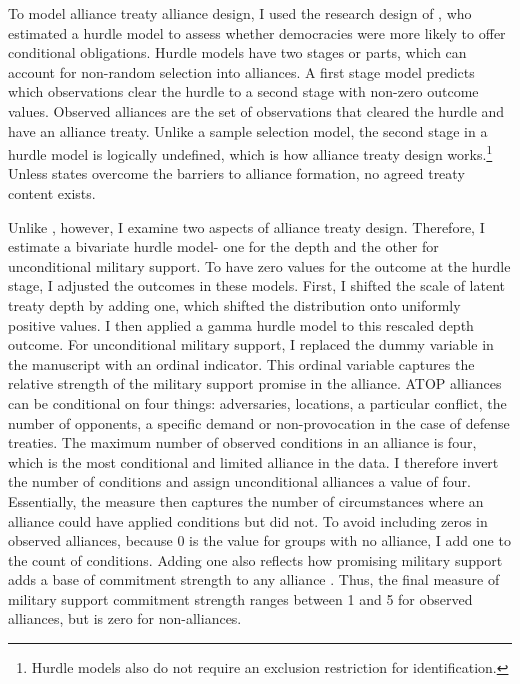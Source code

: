 \documentclass[12pt]{article}
\begin{document}
To model alliance treaty alliance design, I used the research design of \citet{Chibaetal2015}, who estimated a hurdle model to assess whether democracies were more likely to offer conditional obligations.
Hurdle models have two stages or parts, which can account for non-random selection into alliances.
A first stage model predicts which observations clear the hurdle to a second stage with non-zero outcome values. 
Observed alliances are the set of observations that cleared the hurdle and have an alliance treaty. 
Unlike a sample selection model, the second stage in a hurdle model is logically undefined, which is how alliance treaty design works.\footnote{Hurdle models also do not require an exclusion restriction for identification.} 
Unless states overcome the barriers to alliance formation, no agreed treaty content exists. 


Unlike \citet{Chibaetal2015}, however, I examine two aspects of alliance treaty design. 
Therefore, I estimate a bivariate hurdle model- one for the depth and the other for unconditional military support. 
To have zero values for the outcome at the hurdle stage, I adjusted the outcomes in these models. 
First, I shifted the scale of latent treaty depth by adding one, which shifted the distribution onto uniformly positive values. 
I then applied a gamma hurdle model to this rescaled depth outcome.  
For unconditional military support, I replaced the dummy variable in the manuscript with an ordinal indicator.
This ordinal variable captures the relative strength of the military support promise in the alliance. 
ATOP alliances can be conditional on four things: adversaries, locations, a particular conflict, the number of opponents, a specific demand or non-provocation in the case of defense treaties. 
The maximum number of observed conditions in an alliance is four, which is the most conditional and limited alliance in the data. 
I therefore invert the number of conditions and assign unconditional alliances a value of four. 
Essentially, the measure then captures the number of circumstances where an alliance could have applied conditions but did not. 
To avoid including zeros in observed alliances, because 0 is the value for groups with no alliance, I add one to the count of conditions.
Adding one also reflects how promising military support adds a base of commitment strength to any alliance \citep{Morrow2000}. 
Thus, the final measure of military support commitment strength ranges between 1 and 5 for observed alliances, but is zero for non-alliances. 
\end{document}
